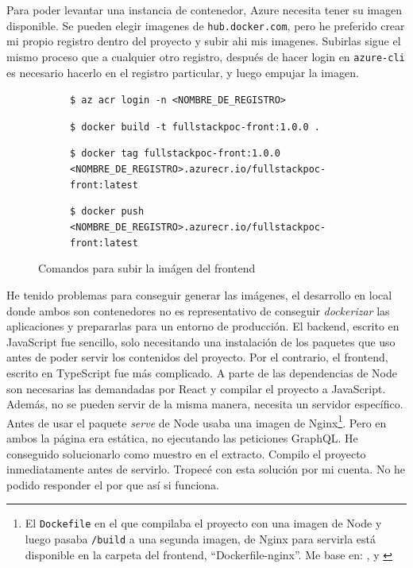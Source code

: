 \documentclass[11pt]{article}
\begin{document}
\begin{flushleft}
	Para poder levantar una instancia de contenedor, Azure necesita tener su imagen disponible. Se pueden elegir imagenes de \texttt{hub.docker.com}, pero he preferido crear mi propio registro dentro del proyecto y subir ahi mis imagenes. Subirlas sigue el mismo proceso que a cualquier otro registro, después de hacer login en \texttt{azure-cli} es necesario hacerlo en el registro particular, y luego empujar la imagen.
	\linebreak
	
	\begin{figure}[htb]
		\centering
		\begin{subfigure}{.9\linewidth}
		\scriptsize
		\texttt{\$ az acr login -n <NOMBRE\_DE\_REGISTRO>} 
				
		\texttt{\$ docker build -t fullstackpoc-front:1.0.0 .}
		
		\texttt{\$ docker tag fullstackpoc-front:1.0.0 <NOMBRE\_DE\_REGISTRO>.azurecr.io/fullstackpoc-front:latest} 
		
		\texttt{\$ docker push <NOMBRE\_DE\_REGISTRO>.azurecr.io/fullstackpoc-front:latest} 
		\end{subfigure}
		
		Comandos para subir la imágen del frontend
	\end{figure}

	He tenido problemas para conseguir generar las imágenes, el desarrollo en local donde ambos son contenedores no es representativo de conseguir \textit{dockerizar} las aplicaciones y prepararlas para un entorno de producción. El backend, escrito en JavaScript fue sencillo, solo necesitando una instalación de los paquetes que uso antes de poder servir los contenidos del proyecto. Por el contrario, el frontend, escrito en TypeScript fue más complicado. A parte de las dependencias de Node son necesarias las demandadas por React y compilar el proyecto a JavaScript. Además, no se pueden servir de la misma manera, necesita un servidor específico. Antes de usar el paquete \textit{serve} de Node usaba una imagen de Nginx\footnote{El \texttt{Dockefile} en el que compilaba el proyecto con una imagen de Node y luego pasaba \texttt{/build} a una segunda imagen, de Nginx para servirla está disponible en la carpeta del frontend, ``Dockerfile-nginx''. Me base en: \cite{docker_nginx1}, \cite{docker_nginxi2} y \cite{docker_nginx3}}. Pero en ambos la página era estática, no ejecutando las peticiones GraphQL. He conseguido solucionarlo como muestro en el extracto. Compilo el proyecto inmediatamente antes de servirlo. Tropecé con esta solución por mi cuenta. No he podido responder el por que así si funciona.
	\linebreak
	

\end{flushleft}
\end{document}
